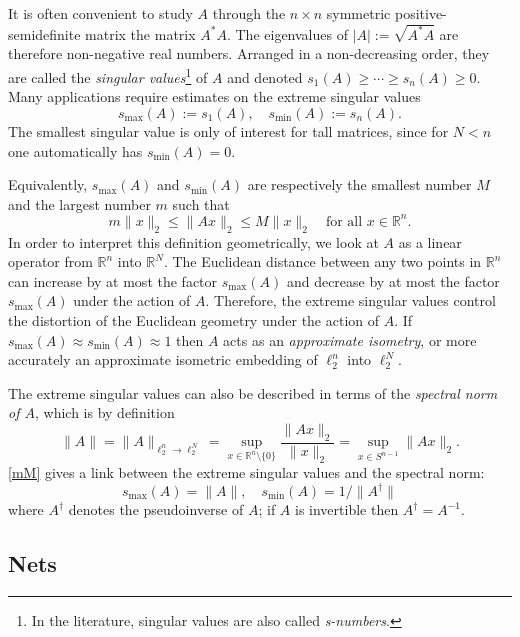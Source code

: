 \documentclass[10pt, openany]{book}
\theoremstyle{remark}
\def \R {\mathbb{R}}
\def \smin {s_{\min}}
\def \smax {s_{\max}}
\begin{document}
It is often convenient to study $A$ through the $n \times n$ symmetric positive-semidefinite matrix the matrix $A^*A$. 
The eigenvalues of $|A| := \sqrt{A^*A}$ are therefore non-negative real numbers. Arranged in a non-decreasing 
order, they are called the {\em singular values}\footnote{In the literature, singular values are also called {\em s-numbers}.}
of $A$ and denoted $s_1(A) \ge \cdots \ge s_n(A) \ge 0$.
Many applications require estimates on the extreme singular values
$$
\smax(A) := s_1(A), \quad \smin(A) := s_n(A).
$$
The smallest singular value is only of interest for tall matrices, since 
for $N < n$ one automatically has $\smin(A) = 0$. 

Equivalently, $\smax(A)$ and $\smin(A)$ 
are respectively the smallest number $M$ and the largest number $m$ such that 
\begin{equation}										\label{mM}
m \|x\|_2 \le \|Ax\|_2 \le M \|x\|_2
\quad \text{for all } x \in \R^n.
\end{equation}
In order to interpret this definition geometrically, we look at $A$ as a linear operator
from $\R^n$ into $\R^N$.
The Euclidean distance between any two points in $\R^n$
can increase by at most the factor $\smax(A)$ and decrease
by at most the factor $\smax(A)$ under the action of $A$.
Therefore, the extreme singular values control the distortion of the Euclidean geometry 
under the action of $A$. If $\smax(A) \approx \smin(A) \approx 1$ then $A$ 
acts as an {\em approximate isometry}, or more accurately an approximate
isometric embedding of $\ell_2^n$ into $\ell_2^N$. 

The extreme singular values can also be described 
in terms of the {\em spectral norm of $A$}, which is by definition
\begin{equation}							\label{spectral norm}
\|A\| = \|A\|_{\ell_2^n \to \ell_2^N} = \sup_{x \in \R^n \setminus \{0\}} \frac{\|Ax\|_2}{\|x\|_2}
= \sup_{x \in S^{n-1}} \|Ax\|_2.
\end{equation}
\eqref{mM} gives a link between the extreme singular values and 
the spectral norm:
$$
\smax(A) = \|A\|, \quad \smin(A) = 1/\|A^\dagger\|
$$
where $A^\dagger$ denotes the pseudoinverse of $A$; if $A$ is invertible then $A^\dagger = A^{-1}$.


\subsection{Nets}
\end{document}
